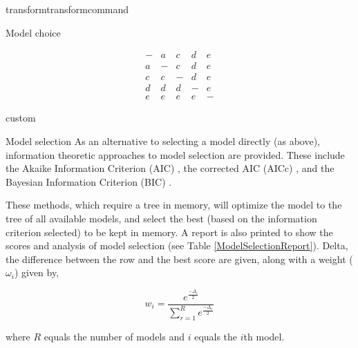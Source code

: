 \begin{command}{transform}{transformcommand}
\begin{arguments}
\begin {argumentgroup} {Model choice}
{                        \begin{equation*}
                            \begin{array}{ccccc}
                                - & a & c & d & e \\
                                a & - & c & d & e \\
                                c & c & - & d & e \\
                                d & d & d & - & e \\
                                e & e & e & e & -
                             \end{array}
                        \end{equation*}

                      
                        }
                        {custom}

                \end{argumentgroup}
     
     
    	\begin {argumentgroup}{Model selection}        
		As an alternative to selecting a model directly (as above), information 
		theoretic approaches to model selection are provided.
                These include the Akaike Information Criterion (AIC)
                \cite{akaike1973}, the corrected AIC (AICc)
                \cite{sugiura1978}, and the Bayesian Information Criterion (BIC)
                \cite{schwarz1978}.
                
                These methods, which require a tree in memory, will optimize the model
                to the tree of all available models, and select the best (based
                on the information criterion selected) to be kept in memory. A
                report is also printed to show the scores and analysis of model
                selection (see Table \ref {ModelSelectionReport}).  Delta, the 
                difference between the row and the best score are given, along
                with a weight (${\omega_i}$) given by,

                    \begin{equation*}
                        w_{i} = \frac{e^{\frac{-\Delta_i}{2}}}
                                     {\sum^R_{r=1} e^{\frac{-\Delta_r}{2}}}
                    \end{equation*}
                    
                    where $R$ equals the number of models and  $i$ equals the $i$th model. 
                    

\end{argumentgroup}
\end{arguments}
\end{command}
